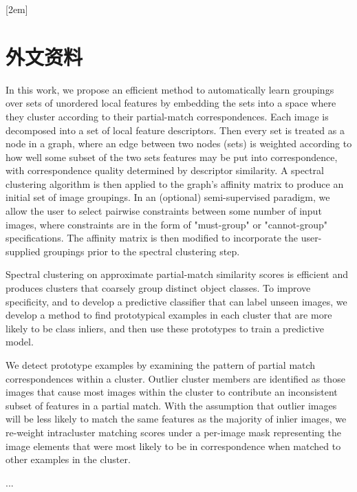 
[2em]{\vspace{.2\baselineskip}\bf\xiaosi\song}%
             {\prechaptername\CJKnumber{\thecontentslabel}\postchaptername\qquad}{}{}             %
\setcounter{page}{1}       %
\clearpage
\chapter*{外文资料}

In this work, we propose an efficient method to automatically learn groupings over sets of unordered local features by embedding the sets into a space where they cluster according to their partial-match correspondences. Each image is decomposed into a set of local feature descriptors. Then every set is treated as a node in a graph, where an edge between two nodes (sets) is weighted according to how well some subset of the two sets features may be put into correspondence, with correspondence quality determined by descriptor similarity. A spectral clustering algorithm is then applied to the graph's affinity matrix to produce an initial set of image groupings. In an (optional) semi-supervised paradigm, we allow the user to select pairwise constraints between some number of input images, where constraints are in the form of "must-group" or "cannot-group" specifications. The affinity matrix is then modified to incorporate the user-supplied groupings prior to the spectral clustering step.


Spectral clustering on approximate partial-match similarity scores is efficient and produces clusters that coarsely group distinct object classes. To improve specificity, and to develop a predictive classifier that can label unseen images, we develop a method to find prototypical examples in each cluster that are more likely to be class inliers, and then use these prototypes to train a predictive model.


We detect prototype examples by examining the pattern of partial match correspondences within a cluster. Outlier cluster members are identified as those images that cause most images within the cluster to contribute an inconsistent subset of features in a partial match. With the assumption that outlier images will be less likely to match the same features as the majority of inlier images, we re-weight intracluster matching scores under a per-image mask representing the image elements that were most likely to be in correspondence when matched to other examples in the cluster.

...
